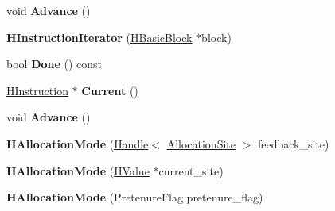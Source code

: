 \begin{DoxyCompactItemize}
\item 
void {\bfseries Advance} ()\hypertarget{classv8_1_1internal_1_1_b_a_s_e___e_m_b_e_d_d_e_d_a3d99e222f406f37deb9382e9e370b68a}{}\label{classv8_1_1internal_1_1_b_a_s_e___e_m_b_e_d_d_e_d_a3d99e222f406f37deb9382e9e370b68a}

\item 
{\bfseries H\+Instruction\+Iterator} (\hyperlink{classv8_1_1internal_1_1_h_basic_block}{H\+Basic\+Block} $\ast$block)\hypertarget{classv8_1_1internal_1_1_b_a_s_e___e_m_b_e_d_d_e_d_a3d06b62df384ee7cfeea830fa93d9e89}{}\label{classv8_1_1internal_1_1_b_a_s_e___e_m_b_e_d_d_e_d_a3d06b62df384ee7cfeea830fa93d9e89}

\item 
bool {\bfseries Done} () const \hypertarget{classv8_1_1internal_1_1_b_a_s_e___e_m_b_e_d_d_e_d_a8434a31674a7e0c9d8be81439e95c281}{}\label{classv8_1_1internal_1_1_b_a_s_e___e_m_b_e_d_d_e_d_a8434a31674a7e0c9d8be81439e95c281}

\item 
\hyperlink{classv8_1_1internal_1_1_h_instruction}{H\+Instruction} $\ast$ {\bfseries Current} ()\hypertarget{classv8_1_1internal_1_1_b_a_s_e___e_m_b_e_d_d_e_d_a40c899cce6d621bb88c373a66d8e3c4c}{}\label{classv8_1_1internal_1_1_b_a_s_e___e_m_b_e_d_d_e_d_a40c899cce6d621bb88c373a66d8e3c4c}

\item 
void {\bfseries Advance} ()\hypertarget{classv8_1_1internal_1_1_b_a_s_e___e_m_b_e_d_d_e_d_a3d99e222f406f37deb9382e9e370b68a}{}\label{classv8_1_1internal_1_1_b_a_s_e___e_m_b_e_d_d_e_d_a3d99e222f406f37deb9382e9e370b68a}

\item 
{\bfseries H\+Allocation\+Mode} (\hyperlink{classv8_1_1internal_1_1_handle}{Handle}$<$ \hyperlink{classv8_1_1internal_1_1_allocation_site}{Allocation\+Site} $>$ feedback\+\_\+site)\hypertarget{classv8_1_1internal_1_1_b_a_s_e___e_m_b_e_d_d_e_d_aa127a1f1dd41599aabb46abcd25c436f}{}\label{classv8_1_1internal_1_1_b_a_s_e___e_m_b_e_d_d_e_d_aa127a1f1dd41599aabb46abcd25c436f}

\item 
{\bfseries H\+Allocation\+Mode} (\hyperlink{classv8_1_1internal_1_1_h_value}{H\+Value} $\ast$current\+\_\+site)\hypertarget{classv8_1_1internal_1_1_b_a_s_e___e_m_b_e_d_d_e_d_ac34f6b19fbe89007a5a45e0f814481b0}{}\label{classv8_1_1internal_1_1_b_a_s_e___e_m_b_e_d_d_e_d_ac34f6b19fbe89007a5a45e0f814481b0}

\item 
{\bfseries H\+Allocation\+Mode} (Pretenure\+Flag pretenure\+\_\+flag)\hypertarget{classv8_1_1internal_1_1_b_a_s_e___e_m_b_e_d_d_e_d_a8b9f31c75715ada50b43e6c253529929}{}\label{classv8_1_1internal_1_1_b_a_s_e___e_m_b_e_d_d_e_d_a8b9f31c75715ada50b43e6c253529929}


\end{DoxyCompactItemize}
